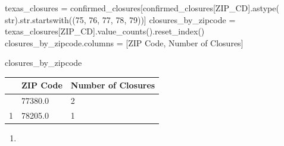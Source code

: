 \documentclass[
  letterpaper,
  DIV=11,
  numbers=noendperiod]{scrartcl}
\newenvironment{Shaded}{\begin{snugshade}}{\end{snugshade}}
\newcommand{\BuiltInTok}[1]{\textcolor[rgb]{0.00,0.23,0.31}{#1}}
\newcommand{\NormalTok}[1]{\textcolor[rgb]{0.00,0.23,0.31}{#1}}
\newcommand{\OperatorTok}[1]{\textcolor[rgb]{0.37,0.37,0.37}{#1}}
\newcommand{\StringTok}[1]{\textcolor[rgb]{0.13,0.47,0.30}{#1}}
\providecommand{\tightlist}{%
  \setlength{\itemsep}{0pt}\setlength{\parskip}{0pt}}\usepackage{longtable,booktabs,array}
\begin{document}
\begin{Shaded}
\begin{Highlighting}[]
\NormalTok{texas\_closures }\OperatorTok{=}\NormalTok{ confirmed\_closures[confirmed\_closures[}\StringTok{\textquotesingle{}ZIP\_CD\textquotesingle{}}\NormalTok{].astype(}
    \BuiltInTok{str}\NormalTok{).}\BuiltInTok{str}\NormalTok{.startswith((}\StringTok{\textquotesingle{}75\textquotesingle{}}\NormalTok{, }\StringTok{\textquotesingle{}76\textquotesingle{}}\NormalTok{, }\StringTok{\textquotesingle{}77\textquotesingle{}}\NormalTok{, }\StringTok{\textquotesingle{}78\textquotesingle{}}\NormalTok{, }\StringTok{\textquotesingle{}79\textquotesingle{}}\NormalTok{))]}
\NormalTok{closures\_by\_zipcode }\OperatorTok{=}\NormalTok{ texas\_closures[}\StringTok{\textquotesingle{}ZIP\_CD\textquotesingle{}}\NormalTok{].value\_counts().reset\_index()}
\NormalTok{closures\_by\_zipcode.columns }\OperatorTok{=}\NormalTok{ [}\StringTok{\textquotesingle{}ZIP Code\textquotesingle{}}\NormalTok{, }\StringTok{\textquotesingle{}Number of Closures\textquotesingle{}}\NormalTok{]}

\NormalTok{closures\_by\_zipcode}
\end{Highlighting}
\end{Shaded}

\begin{longtable}[]{@{}lll@{}}
\toprule\noalign{}
& ZIP Code & Number of Closures \\
\midrule\noalign{}
\endhead
\bottomrule\noalign{}
\endlastfoot
0 & 77380.0 & 2 \\
1 & 78205.0 & 1 \\
\end{longtable}

\begin{enumerate}
\def\labelenumi{\arabic{enumi}.}
\setcounter{enumi}{1}
\tightlist
\item
\end{enumerate}
\end{document}
